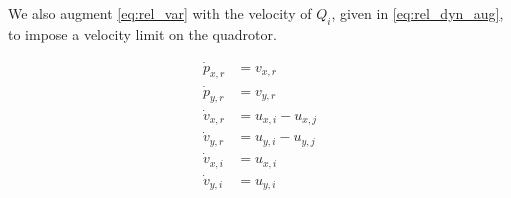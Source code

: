 We also augment \eqref{eq:rel_var} with the velocity of $Q_i$, given in \eqref{eq:rel_dyn_aug}, to impose a velocity limit on the quadrotor.

\begin{equation} \label{eq:rel_dyn_aug}
\begin{aligned}
\dot{p}_{x,r} &= v_{x,r} \\
\dot{p}_{y,r} &= v_{y,r} \\
\dot{v}_{x,r} &= u_{x,i} - u_{x,j} \\
\dot{v}_{y,r} &= u_{y,i} - u_{y,j} \\
\dot{v}_{x,i} &= u_{x,i} \\
\dot{v}_{y,i} &= u_{y,i}
\end{aligned}
\end{equation}